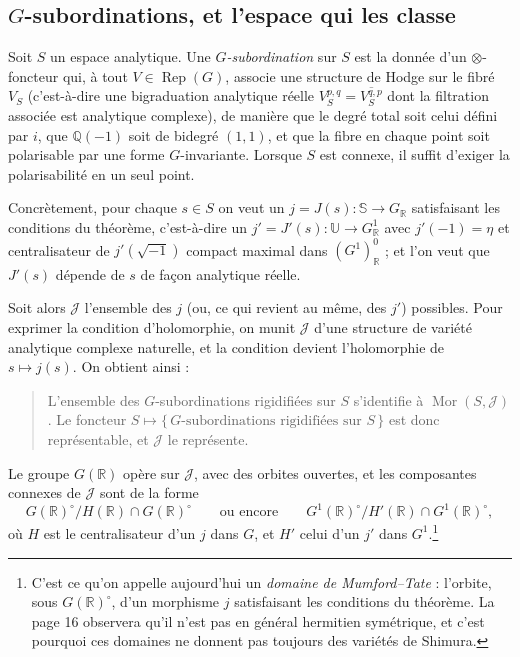 \documentclass[11pt,a4paper]{article}
\begin{document}
\subsection*{$G$-subordinations, et l'espace qui les classe}

Soit $S$ un espace analytique. Une \emph{$G$-subordination} sur $S$ est la
donnée d'un $\otimes$-foncteur qui, à tout $V \in \operatorname{Rep}(G)$, associe
une structure de Hodge sur le fibré $V_{S}$ (c'est-à-dire une bigraduation
analytique réelle $V_{S}^{p,q} = \overline{V_{S}^{q,p}}$ dont la filtration
associée est analytique complexe), de manière que le degré total soit celui
défini par $i$, que $\mathbb{Q}(-1)$ soit de bidegré $(1,1)$, et que la fibre en
chaque point soit polarisable par une forme $G$-invariante. Lorsque $S$ est
connexe, il suffit d'exiger la polarisabilité en un seul point.

Concrètement, pour chaque $s \in S$ on veut
un $j = J(s) : \mathbb{S} \to G_{\mathbb{R}}$ satisfaisant les conditions du
théorème, c'est-à-dire un $j' = J'(s) : \mathbb{U} \to G^{1}_{\mathbb{R}}$ avec
$j'(-1) = \eta$ et centralisateur de $j'(\sqrt{-1})$ compact maximal dans
$(G^{1})^{0}_{\mathbb{R}}$ ; et l'on veut que $J'(s)$ dépende de $s$ de façon
analytique réelle.

Soit alors $\mathcal{J}$ l'ensemble des $j$ (ou, ce qui revient au même, des
$j'$) possibles. Pour exprimer la condition d'holomorphie, on munit
$\mathcal{J}$ d'une structure de variété analytique complexe naturelle, et la
condition devient l'holomorphie de $s \mapsto j(s)$. On obtient ainsi :

\begin{quote}
L'ensemble des $G$-subordinations rigidifiées sur $S$ s'identifie à
$\operatorname{Mor}(S, \mathcal{J})$. Le foncteur $S \mapsto \{\,
G\text{-subordinations rigidifiées sur } S \,\}$ est donc représentable, et
$\mathcal{J}$ le représente.
\end{quote}

Le groupe $G(\mathbb{R})$ opère sur $\mathcal{J}$, avec des orbites ouvertes, et
les composantes connexes de $\mathcal{J}$ sont de la forme
\[
G(\mathbb{R})^{\circ} \big/ H(\mathbb{R}) \cap G(\mathbb{R})^{\circ}
\qquad\text{ou encore}\qquad
G^{1}(\mathbb{R})^{\circ} \big/ H'(\mathbb{R}) \cap G^{1}(\mathbb{R})^{\circ} ,
\]
où $H$ est le centralisateur d'un $j$ dans $G$, et $H'$ celui d'un $j'$ dans
$G^{1}$.\footnote{C'est ce qu'on appelle aujourd'hui un \emph{domaine de
Mumford--Tate} : l'orbite, sous $G(\mathbb{R})^{\circ}$, d'un morphisme
$j$ satisfaisant les conditions du théorème. La page 16 observera qu'il n'est pas
en général hermitien symétrique, et c'est pourquoi
ces domaines ne donnent pas toujours des variétés de Shimura.}
\end{document}
